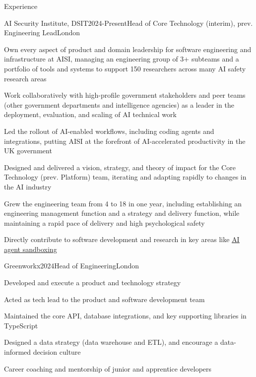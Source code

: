 \documentclass{resume} %
\begin{document}
\vspace{5 mm}

\begin{rSection}{Experience}

\begin{rSubsection}{{AI Security Institute, DSIT}}{2024-Present}{Head of Core Technology (interim), prev. Engineering Lead}{London}
    \item Own every aspect of product and domain leadership for software engineering and infrastructure at AISI, managing an engineering group of 3+ subteams and a portfolio of tools and systems to support 150 researchers across many AI safety research areas
    \item Work collaboratively with high-profile government stakeholders and peer teams (other government departments and intelligence agencies) as a leader in the deployment, evaluation, and scaling of AI technical work
    \item Led the rollout of AI-enabled workflows, including coding agents and integrations, putting AISI at the forefront of AI-accelerated productivity in the UK government
    \item Designed and delivered a vision, strategy, and theory of impact for the Core Technology (prev. Platform) team, iterating and adapting rapidly to changes in the AI industry
    \item Grew the engineering team from 4 to 18 in one year, including establishing an engineering management function and a strategy and delivery function, while maintaining a rapid pace of delivery and high psychological safety
    \item Directly contribute to software development and research in key areas like \href{https://arxiv.org/abs/2603.02277}{\underline{AI agent sandboxing}}
\end{rSubsection}

\begin{rSubsection}{{Greenworkx}}{2024}{Head of Engineering}{London}
    \item Developed and execute a product and technology strategy
    \item Acted as tech lead to the product and software development team
    \item Maintained the core API, database integrations, and key supporting libraries in TypeScript
    \item Designed a data strategy (data warehouse and ETL), and encourage a data-informed decision culture
    \item Career coaching and mentorship of junior and apprentice developers
\end{rSubsection}


\end{rSection}
\end{document}

